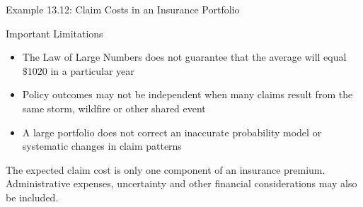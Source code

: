 \documentclass[aspectratio=169]{beamer}
\begin{document}
\begin{frame}{Example 13.12: Claim Costs in an Insurance Portfolio}
\begin{alertblock}{Important Limitations}
\begin{itemize}
	\item The Law of Large Numbers does not guarantee that the average will equal $\$1020$ in a particular year
	\item Policy outcomes may not be independent when many claims result from the same storm, wildfire or other shared event
	\item A large portfolio does not correct an inaccurate probability model or systematic changes in claim patterns
\end{itemize}
\end{alertblock}

The expected claim cost is only one component of an insurance premium. Administrative expenses, uncertainty and other financial considerations may also be included.
\end{frame}
\end{document}
